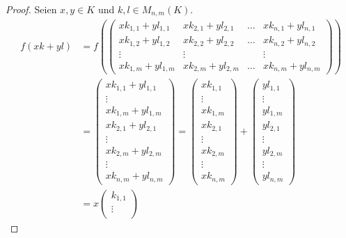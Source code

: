 \documentclass[a4paper,10pt]{article}
\begin{document}
\begin{proof}
 Seien $x, y \in K$ und $k, l \in M_{n,m}(K)$.
 \begin{align}
  f(xk + yl) & = f(\begin{pmatrix}
                  xk_{1,1} + yl_{1,1} & xk_{2,1} + yl_{2,1} & \dots & xk_{n,1} + yl_{n,1}\\
                  xk_{1,2} + yl_{1,2} & xk_{2,2} + yl_{2,2} & \dots & xk_{n,2} + yl_{n,2}\\
                  \vdots & \vdots & & \vdots\\
                  xk_{1,m} + yl_{1,m} & xk_{2,m} + yl_{2,m} & \dots & xk_{n,m} + yl_{n,m}
                 \end{pmatrix})\\
  & = \begin{pmatrix}
       xk_{1,1} + yl_{1,1}\\
       \vdots\\
       xk_{1,m} + yl_{1,m}\\
       xk_{2,1} + yl_{2,1}\\
       \vdots\\
       xk_{2,m} + yl_{2,m}\\
       \vdots\\
       xk_{n,m} + yl_{n,m}
      \end{pmatrix}
    = \begin{pmatrix}
       xk_{1,1}\\
       \vdots\\
       xk_{1,m}\\
       xk_{2,1}\\
       \vdots\\
       xk_{2,m}\\
       \vdots\\
       xk_{n,m}
      \end{pmatrix}
    + \begin{pmatrix}
       yl_{1,1}\\
       \vdots\\
       yl_{1,m}\\
       yl_{2,1}\\
       \vdots\\
       yl_{2,m}\\
       \vdots\\
       yl_{n,m}
      \end{pmatrix}\\
  & = x\begin{pmatrix}
       k_{1,1}\\
       \vdots\\

\end{pmatrix}
\end{align}
\end{proof}
\end{document}
